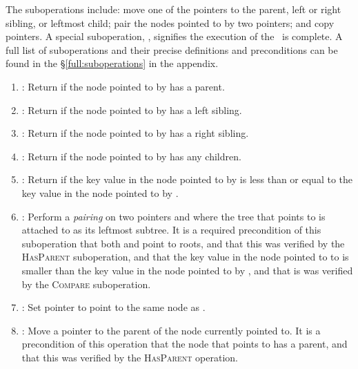 \begin{shortonly}
The suboperations include: move one of the pointers to the parent, left or right sibling, or leftmost child; pair the nodes pointed to by two pointers; and copy pointers.
A special suboperation, , signifies the execution of the \opEm\ is complete.
A full list of suboperations and their precise definitions and preconditions can be found in the \S\ref{full:suboperations} in the appendix.
\end{shortonly}
\begin{fullonly}
\begin{enumerate}

\item {} : Return if the node pointed to by  has a parent.

\item {}: Return if the node pointed to by  has a left sibling.

\item {}: Return if the node pointed to by  has a right sibling.

\item {}:  Return if the node pointed to by  has any children.

\item {}: Return if the key value in the node pointed to by  is less than or equal to the key value in the node pointed to by .

\item {}: Perform a \emph{pairing} on two pointers  and  where the tree that  points to is attached to  as its leftmost subtree. It is a required precondition of this suboperation that both  and  point to roots, and that this was verified by the \textsc{HasParent} suboperation, and that the key value in the node pointed to to  is smaller than the key value in the node pointed to by , and that is was verified by the \textsc{Compare} suboperation.

\item {}: Set pointer  to point to the same node as .

\item {}: Move a pointer  to the parent of the node currently pointed to.
It is a precondition of this operation that the node that  points to has a parent, and that this was verified by the \textsc{HasParent} operation.


\end{enumerate}
\end{fullonly}
